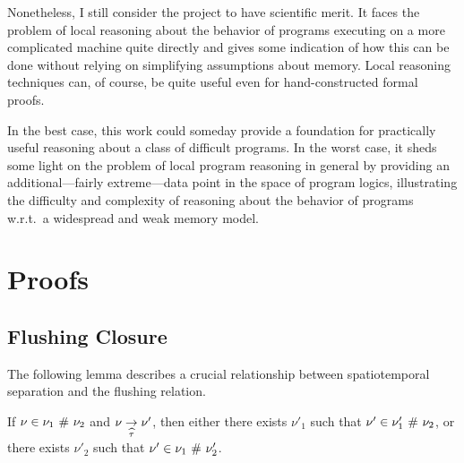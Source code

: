 \documentclass[11pt]{report}
\begin{document}
Nonetheless, I still consider the project to have scientific merit. It faces the problem of local reasoning about the behavior of programs executing on a more complicated machine quite directly and gives some indication of how this can be done without relying on simplifying assumptions about memory. Local reasoning techniques can, of course, be quite useful even for hand-constructed formal proofs. 

In the best case, this work could someday provide a foundation for practically useful reasoning about a class of difficult programs. In the worst case, it sheds some light on the problem of local program reasoning in general by providing an additional---fairly extreme---data point in the space of program logics, illustrating the difficulty and complexity of reasoning about the behavior of programs w.r.t.~a widespread and weak memory model. 



 

\appendix

\chapter{Proofs}

\section{Flushing Closure}


The following lemma describes a crucial relationship between spatiotemporal separation and the flushing relation. 

\begin{lemma}
  \label{lem:separation-tau}
  If $\nu \in \nu_1 \operatorname{\,\#\,} \nu_2$ and $\nu \underset{\widehat{\tau}}{\rightarrow} \nu'$, then either there exists $\nu'_1$ such that $\nu' \in \nu'_1 \operatorname{\,\#\,} \nu_2$, or there exists $\nu'_2$ such that $\nu' \in \nu_1 \operatorname{\,\#\,} \nu'_2$.
\end{lemma}
\end{document}
